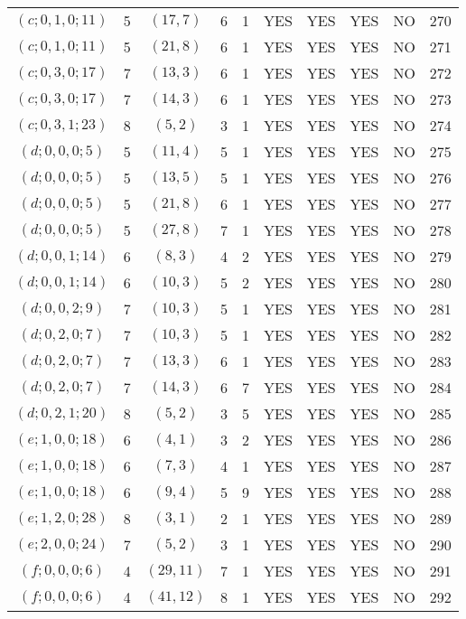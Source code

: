 \begin{longtable}{|c|c|c|c|c|c|c|c|c|c|}
$(c; 0, 1, 0; 11)$ & 5 & $(17, 7)$ & 6 & 1 & YES & YES & YES & NO & 270\\
$(c; 0, 1, 0; 11)$ & 5 & $(21, 8)$ & 6 & 1 & YES & YES & YES & NO & 271\\
$(c; 0, 3, 0; 17)$ & 7 & $(13, 3)$ & 6 & 1 & YES & YES & YES & NO & 272\\
$(c; 0, 3, 0; 17)$ & 7 & $(14, 3)$ & 6 & 1 & YES & YES & YES & NO & 273\\
$(c; 0, 3, 1; 23)$ & 8 & $(5, 2)$ & 3 & 1 & YES & YES & YES & NO & 274\\
$(d; 0, 0, 0; 5)$ & 5 & $(11, 4)$ & 5 & 1 & YES & YES & YES & NO & 275\\
$(d; 0, 0, 0; 5)$ & 5 & $(13, 5)$ & 5 & 1 & YES & YES & YES & NO & 276\\
$(d; 0, 0, 0; 5)$ & 5 & $(21, 8)$ & 6 & 1 & YES & YES & YES & NO & 277\\
$(d; 0, 0, 0; 5)$ & 5 & $(27, 8)$ & 7 & 1 & YES & YES & YES & NO & 278\\
$(d; 0, 0, 1; 14)$ & 6 & $(8, 3)$ & 4 & 2 & YES & YES & YES & NO & 279\\
$(d; 0, 0, 1; 14)$ & 6 & $(10, 3)$ & 5 & 2 & YES & YES & YES & NO & 280\\
$(d; 0, 0, 2; 9)$ & 7 & $(10, 3)$ & 5 & 1 & YES & YES & YES & NO & 281\\
$(d; 0, 2, 0; 7)$ & 7 & $(10, 3)$ & 5 & 1 & YES & YES & YES & NO & 282\\
$(d; 0, 2, 0; 7)$ & 7 & $(13, 3)$ & 6 & 1 & YES & YES & YES & NO & 283\\
$(d; 0, 2, 0; 7)$ & 7 & $(14, 3)$ & 6 & 7 & YES & YES & YES & NO & 284\\
$(d; 0, 2, 1; 20)$ & 8 & $(5, 2)$ & 3 & 5 & YES & YES & YES & NO & 285\\
$(e; 1, 0, 0; 18)$ & 6 & $(4, 1)$ & 3 & 2 & YES & YES & YES & NO & 286\\
$(e; 1, 0, 0; 18)$ & 6 & $(7, 3)$ & 4 & 1 & YES & YES & YES & NO & 287\\
$(e; 1, 0, 0; 18)$ & 6 & $(9, 4)$ & 5 & 9 & YES & YES & YES & NO & 288\\
$(e; 1, 2, 0; 28)$ & 8 & $(3, 1)$ & 2 & 1 & YES & YES & YES & NO & 289\\
$(e; 2, 0, 0; 24)$ & 7 & $(5, 2)$ & 3 & 1 & YES & YES & YES & NO & 290\\
$(f; 0, 0, 0; 6)$ & 4 & $(29, 11)$ & 7 & 1 & YES & YES & YES & NO & 291\\
$(f; 0, 0, 0; 6)$ & 4 & $(41, 12)$ & 8 & 1 & YES & YES & YES & NO & 292\\

\end{longtable}
